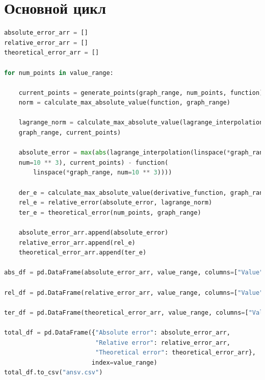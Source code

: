 \documentclass{article}
\begin{document}
\section{Основной цикл}
\begin{lstlisting}[language=Python]
absolute_error_arr = []
relative_error_arr = []
theoretical_error_arr = []

for num_points in value_range:

    current_points = generate_points(graph_range, num_points, function)
    norm = calculate_max_absolute_value(function, graph_range)
    
    lagrange_norm = calculate_max_absolute_value(lagrange_interpolation,
    graph_range, current_points)
    
    absolute_error = max(abs(lagrange_interpolation(linspace(*graph_range,
    num=10 ** 3), current_points) - function(
        linspace(*graph_range, num=10 ** 3))))
        
    der_e = calculate_max_absolute_value(derivative_function, graph_range)
    rel_e = relative_error(absolute_error, lagrange_norm)
    ter_e = theoretical_error(num_points, graph_range)

    absolute_error_arr.append(absolute_error)
    relative_error_arr.append(rel_e)
    theoretical_error_arr.append(ter_e)

abs_df = pd.DataFrame(absolute_error_arr, value_range, columns=["Value"])

rel_df = pd.DataFrame(relative_error_arr, value_range, columns=["Value"])

ter_df = pd.DataFrame(theoretical_error_arr, value_range, columns=["Value"])

total_df = pd.DataFrame({"Absolute error": absolute_error_arr,
                         "Relative error": relative_error_arr,
                         "Theoretical error": theoretical_error_arr},
                        index=value_range)
total_df.to_csv("ansv.csv")


    
\end{lstlisting}
\end{document}
